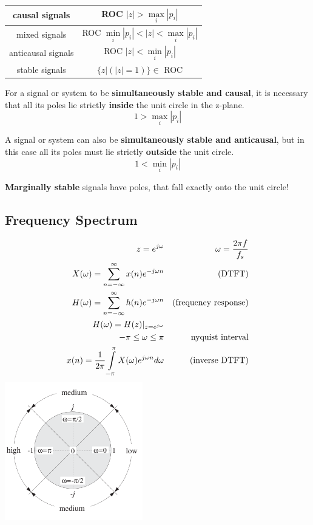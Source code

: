 \begin{center}
\begin{tabular}{|c|c|}
	\hline
	causal signals
		& ROC $|z| > \max\limits_{i}|p_i|$\\
	\hline
	mixed signals
		& ROC $\min\limits_{i}|p_i| < |z| < \max\limits_{i}|p_i|$ \\
	\hline
	anticausal signals
		& ROC $|z| < \min\limits_{i}|p_i|$\\
	\hline
	stable signals
		& $\{z\Big|(|z| = 1)\} \in$ ROC\\
	\hline
\end{tabular}
\end{center}


For a signal or system to be \textbf{simultaneously stable and causal}, it is necessary that all its poles lie strictly 
\textbf{inside} the unit circle in the z-plane. 
\[ 1 > \max\limits_{i}|p_i| \]

A signal or system
can also be \textbf{simultaneously stable and anticausal}, but in this case all its poles must lie
strictly \textbf{outside} the unit circle.
\[ 1 < \min\limits_{i}|p_i| \]

\textbf{Marginally stable} signals have poles, that fall exactly onto the unit circle!

\newpage
\subsection{Frequency Spectrum}
\begin{multicols}{2}
	\begin{align}
	z=e^{j\omega} && \omega = \frac{2 \pi f}{f_s} \notag\\
	X(\omega)= \sum\limits_{n=-\infty}^{\infty} x(n)e^{-j\omega n} &&  \text{(DTFT)} \notag \\
	H(\omega)= \sum\limits_{n=-\infty}^{\infty} h(n)e^{-j\omega n} &&  \text{(frequency response)} \notag \\
	H(\omega)= H(z)|_{z=e^{j\omega}} \notag \\
	 -\pi \leq \omega \leq \pi && \text{nyquist interval}\notag\\
	x(n)= \frac{1}{2\pi} \int\limits_{-\pi}^{\pi} X(\omega)e^{j\omega n} d\omega &&\text{(inverse DTFT)} \notag
	\end{align}
\columnbreak
  \includegraphics[width=6cm]{./picture/freq_spect}
\end{multicols}

